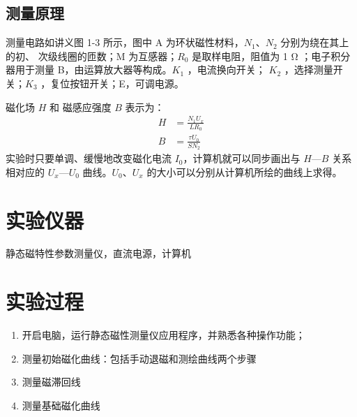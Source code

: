 \documentclass[a4paper,utf8]{article}
\begin{document}
    \subsection{测量原理}
        测量电路如讲义图 1-3 所示，图中 A 为环状磁性材料，$N_1$、$N_2$ 分别为绕在其上的初、 次级线圈的匝数；M 为互感器；$R_0$ 是取样电阻，阻值为 1 \unit{\ohm} ；电子积分器用于测量 B，由运算放大器等构成。$K_1$ ，电流换向开关； $K_2$ ，选择测量开关；$K_3$ ，复位按钮开关；E，可调电源。\par
        磁化场 $H$ 和 磁感应强度 $B$ 表示为：
        \begin{align}
            H&=\frac{N_1 U_x}{L R_0}\label{eq:1}\\
            B&=\frac{\tau U_0}{S N_2}\label{eq:2}
        \end{align}
        实验时只要单调、缓慢地改变磁化电流 $I_0$，计算机就可以同步画出与 $H—B$ 关系相对应的 $U_x—U_0$ 曲线。$U_0$、$U_x$ 的大小可以分别从计算机所绘的曲线上求得。
\section{实验仪器}%
    静态磁特性参数测量仪，直流电源，计算机
\section{实验过程}%
    \begin{enumerate}
        \item 开启电脑，运行静态磁性测量仪应用程序，并熟悉各种操作功能；
        \item 测量初始磁化曲线：包括手动退磁和测绘曲线两个步骤
        \item 测量磁滞回线
        \item 测量基础磁化曲线
    \end{enumerate}
\end{document}
